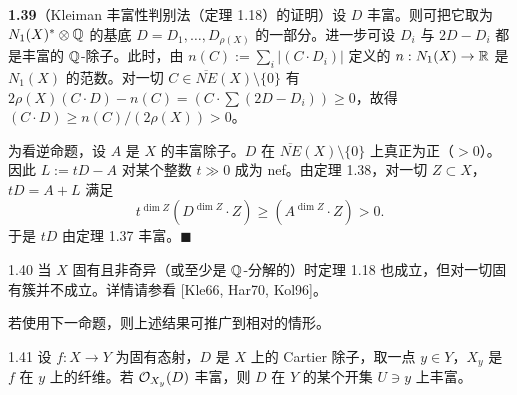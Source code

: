
\par\medskip\noindent\textbf{1.39}（Kleiman 丰富性判别法（定理 1.18）的证明）\quad 设 $D$ 丰富。则可把它取为 $N_1(X)^*\otimes\mathbb{Q}$ 的基底 $D=D_1,\dots,D_{\rho(X)}$ 的一部分。进一步可设 $D_i$ 与 $2D-D_i$ 都是丰富的 $\mathbb{Q}$-除子。此时，由 $n(C):=\sum_i|(C\cdot D_i)|$ 定义的 $n:N_1(X)\to\mathbb{R}$ 是 $N_1(X)$ 的范数。对一切 $C\in\overline{NE}(X)\setminus\{0\}$ 有
$2\rho(X)(C\cdot D)-n(C)=(C\cdot\sum(2D-D_i))\ge0$，故得 $(C\cdot D)\ge n(C)/(2\rho(X))>0$。

为看逆命题，设 $A$ 是 $X$ 的丰富除子。$D$ 在 $\overline{NE}(X)\setminus\{0\}$ 上真正为正（$>0$）。因此 $L:=tD-A$ 对某个整数 $t\gg0$ 成为 nef。由定理 1.38，对一切 $Z\subset X$，$tD=A+L$ 满足
\[ t^{\dim Z}(D^{\dim Z}\cdot Z)\ge(A^{\dim Z}\cdot Z)>0. \]
于是 $tD$ 由定理 1.37 丰富。\hfill$\blacksquare$

\begin{remark}{1.40}
当 $X$ 固有且非奇异（或至少是 $\mathbb{Q}$-分解的）时定理 1.18 也成立，但对一切固有簇并不成立。详情请参看 [Kle66, Har70, Kol96]。
\end{remark}


若使用下一命题，则上述结果可推广到相对的情形。

\begin{propositionp}{1.41}
设 $f:X\to Y$ 为固有态射，$D$ 是 $X$ 上的 Cartier 除子，取一点 $y\in Y$，$X_y$ 是 $f$ 在 $y$ 上的纤维。若 $\mathcal{O}_{X_y}(D)$ 丰富，则 $D$ 在 $Y$ 的某个开集 $U\ni y$ 上丰富。
\end{propositionp}

